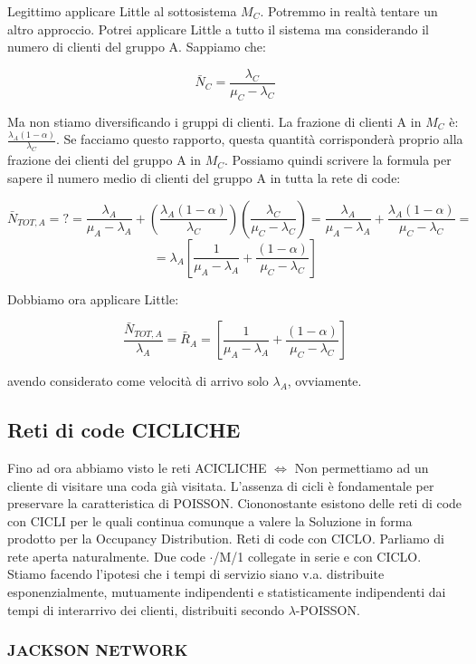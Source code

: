 Legittimo applicare Little al sottosistema $M_C$. Potremmo in realtà tentare un altro approccio. Potrei applicare Little a tutto il sistema ma considerando il numero di clienti del gruppo A. Sappiamo che:

\[
	\bar{N}_C = \frac{\lambda_C}{\mu_C-\lambda_C}
\]

Ma non stiamo diversificando i gruppi di clienti. La frazione di clienti A in $M_C$ è: $\frac{\lambda_A(1-\alpha)}{\lambda_C}$. Se facciamo questo rapporto, questa quantità corrisponderà proprio alla frazione dei clienti del gruppo A in $M_C$. Possiamo quindi scrivere la formula per sapere il numero medio di clienti del gruppo A in tutta la rete di code:

\[
	\bar{N}_{TOT,A} = ? = \frac{\lambda_A}{\mu_A-\lambda_A}+(\frac{\lambda_A(1-\alpha)}{\lambda_C})(\frac{\lambda_C}{\mu_C-\lambda_C}) = \frac{\lambda_A}{\mu_A-\lambda_A} + \frac{\lambda_A(1-\alpha)}{\mu_C-\lambda_C} =
\]
\[
	= \lambda_A[\frac{1}{\mu_A-\lambda_A}+\frac{(1-\alpha)}{\mu_C-\lambda_C}]
\]

Dobbiamo ora applicare Little:

\[
	\frac{\bar{N}_{TOT,A}}{\lambda_A} = \bar{R}_A = [\frac{1}{\mu_A-\lambda_A}+\frac{(1-\alpha)}{\mu_C-\lambda_C}]
\]

avendo considerato come velocità di arrivo solo $\lambda_A$, ovviamente.

\subsection{Reti di code CICLICHE}

Fino ad ora abbiamo visto le reti ACICLICHE $\iff$ Non permettiamo ad un cliente di visitare una coda già visitata. L'assenza di cicli è fondamentale per preservare la caratteristica di POISSON. Ciononostante esistono delle reti di code con CICLI per le quali continua comunque a valere la Soluzione in forma prodotto per la Occupancy Distribution. Reti di code con CICLO. Parliamo di rete aperta naturalmente. Due code $\mathord{\cdot}$/M/1 collegate in serie e con CICLO. Stiamo facendo l'ipotesi che i tempi di servizio siano v.a. distribuite esponenzialmente, mutuamente indipendenti e statisticamente indipendenti dai tempi di interarrivo dei clienti, distribuiti secondo $\lambda$-POISSON. 

\subsubsection{JACKSON NETWORK}

